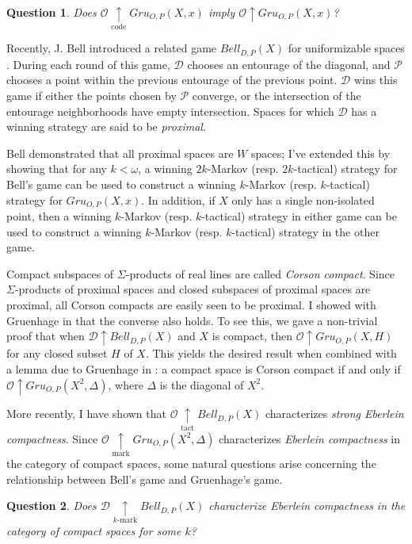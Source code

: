 \documentclass[11pt]{amsart}
\theoremstyle{plain}
\newtheorem{question}{Question}
\newcommand{\win}{\uparrow}
\newcommand{\markwin}{\underset{\text{mark}}{\uparrow}}
\newcommand{\tactwin}{\underset{\text{tact}}{\uparrow}}
\newcommand{\kmarkwin}[1]{\underset{#1\text{-mark}}{\uparrow}}
\newcommand{\codewin}{\underset{\text{code}}{\uparrow}}
\newcommand{\gruConGame}[2]{Gru_{O,P}(#1,#2)}
\newcommand{\bellConGame}[1]{Bell_{D,P}(#1)}
\newcommand{\<}{\langle}
\renewcommand{\>}{\rangle}
\newcommand{\pl}[1]{\mathscr{#1}}
\newcommand{\term}{\textit}
\begin{document}
\begin{question}
  Does $\pl O\codewin\gruConGame{X}{x}$ imply $\pl O\win\gruConGame{X}{x}$?
\end{question}

Recently, J. Bell introduced a related game $\bellConGame{X}$ for uniformizable
spaces \cite{MR3239205}. During each round of this game, $\pl D$ chooses an
entourage of the diagonal, and $\pl P$ chooses a point within the previous
entourage of the previous point.
$\pl D$ wins this game if either the points chosen by $\pl P$ converge,
or the intersection of the entourage neighborhoods have empty intersection.
Spaces for which $\pl D$ has a winning strategy
are said to be \term{proximal}.

Bell demonstrated that all proximal spaces
are $W$ spaces; I've extended this by showing that for any $k<\omega$,
a winning $2k$-Markov (resp. $2k$-tactical) strategy for Bell's game can be
used to construct a winning $k$-Markov (resp. $k$-tactical) strategy for
$\gruConGame{X}{x}$. In addition, if $X$ only has a single non-isolated point,
then a winning $k$-Markov (resp. $k$-tactical) strategy in either game can be
used to construct a winning $k$-Markov (resp. $k$-tactical) strategy in the
other game.

Compact subspaces of $\Sigma$-products of real lines are called
\term{Corson compact}. Since $\Sigma$-products of proximal spaces and
closed subspaces of proximal spaces are proximal, all Corson compacts are
easily seen to be proximal. I showed with Gruenhage in \cite{MR3227201} that
the converse also holds. To see this, we gave a non-trivial proof that when
$\pl D\win\bellConGame{X}$ and $X$ is compact, then
$\pl O\win\gruConGame{X}{H}$ for any closed subset
$H$ of $X$. This yields the desired result when combined with a lemma due to
Gruenhage in \cite{MR752278}: a
compact space is Corson compact if and only if
$\pl O\win\gruConGame{X^2}{\Delta}$, where $\Delta$ is the diagonal of $X^2$.

More recently, I have shown that $\pl O\tactwin\bellConGame{X}$ characterizes
\term{strong Eberlein compactness}.
Since $\pl O\markwin\gruConGame{X^2}{\Delta}$ characterizes \term{Eberlein
compactness} in the category of compact spaces, some natural questions arise
concerning the relationship between Bell's game and Gruenhage's game.

\begin{question}
  Does $\pl D\kmarkwin{k}\bellConGame{X}$
  characterize Eberlein compactness in the category of compact spaces
  for some $k$?
\end{question}
\end{document}
